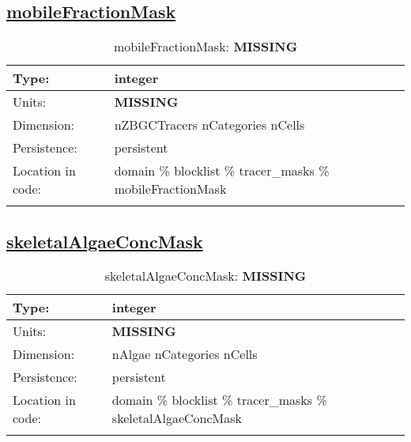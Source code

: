 \subsection[mobileFractionMask]{\hyperref[sec:var_tab_tracer_masks]{mobileFractionMask}}
\label{subsec:var_sec_tracer_masks_mobileFractionMask}
\begin{center}
\begin{longtable}{| p{2.0in} | p{4.0in} |}
        \hline 
        Type: & integer \\
        \hline 
        Units: & {\bf \color{red} MISSING} \\
        \hline 
        Dimension: & nZBGCTracers nCategories nCells \\
        \hline 
        Persistence: & persistent \\
        \hline 
         Location in code: & domain \% blocklist \% tracer\_masks \% mobileFractionMask \\
         \hline 
    \caption{mobileFractionMask: {\bf \color{red} MISSING}}
\end{longtable}
\end{center}
\subsection[skeletalAlgaeConcMask]{\hyperref[sec:var_tab_tracer_masks]{skeletalAlgaeConcMask}}
\label{subsec:var_sec_tracer_masks_skeletalAlgaeConcMask}
\begin{center}
\begin{longtable}{| p{2.0in} | p{4.0in} |}
        \hline 
        Type: & integer \\
        \hline 
        Units: & {\bf \color{red} MISSING} \\
        \hline 
        Dimension: & nAlgae nCategories nCells \\
        \hline 
        Persistence: & persistent \\
        \hline 
         Location in code: & domain \% blocklist \% tracer\_masks \% skeletalAlgaeConcMask \\
         \hline 
    \caption{skeletalAlgaeConcMask: {\bf \color{red} MISSING}}
\end{longtable}
\end{center}

